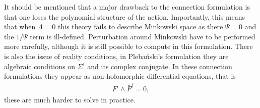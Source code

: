 \documentclass[10pt]{report}
\newcommand{\pleb}[0]{Pleba\'nski}
\theoremstyle{definition}
\begin{document}
It should be mentioned that a major drawback to the connection formulation is that one loses the polynomial structure of the action. Importantly, this means that when $\Lambda = 0$ this theory fails to describe Minkowski space as there $\Psi = 0$ and the $1/\Psi$ term is ill-defined. Perturbation around Minkowski have to be performed more carefully, although it is still possible to compute in this formulation. There is also the issue of reality conditions, in \pleb{}'s formulation they are algebraic conditions on $\Sigma^i$ and its complex conjugate. In these connection formulations they appear as non-holomorphic differential equations, that is 
\begin{align}
    F^i \wedge \bar{F}^j = 0,
\end{align}
these are much harder to solve in practice.
\end{document}
